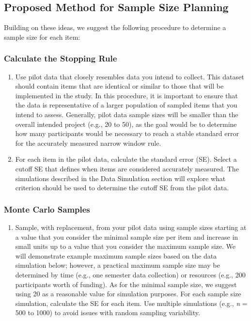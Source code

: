 \documentclass[
  man]{apa7}
\providecommand{\tightlist}{%
  \setlength{\itemsep}{0pt}\setlength{\parskip}{0pt}}
\begin{document}
\subsection{Proposed Method for Sample Size Planning}\label{proposed-method-for-sample-size-planning}

Building on these ideas, we suggest the following procedure to determine a sample size for each item:

\subsubsection{Calculate the Stopping Rule}\label{calculate-the-stopping-rule}

\begin{enumerate}
\def\labelenumi{\arabic{enumi})}
\item
  Use pilot data that closely resembles data you intend to collect. This dataset should contain items that are identical or similar to those that will be implemented in the study. In this procedure, it is important to ensure that the data is representative of a larger population of sampled items that you intend to assess. Generally, pilot data sample sizes will be smaller than the overall intended project (e.g., 20 to 50), as the goal would be to determine how many participants would be necessary to reach a stable standard error for the accurately measured narrow window rule.
\item
  For each item in the pilot data, calculate the standard error (SE). Select a cutoff SE that defines when items are considered accurately measured. The simulations described in the Data Simulation section will explore what criterion should be used to determine the cutoff SE from the pilot data.
\end{enumerate}

\subsubsection{Monte Carlo Samples}\label{monte-carlo-samples}

\begin{enumerate}
\def\labelenumi{\arabic{enumi})}
\setcounter{enumi}{2}
\tightlist
\item
  Sample, with replacement, from your pilot data using sample sizes starting at a value that you consider the minimal sample size per item and increase in small units up to a value that you consider the maximum sample size. We will demonstrate example maximum sample sizes based on the data simulation below; however, a practical maximum sample size may be determined by time (e.g., one semester data collection) or resources (e.g., 200 participants worth of funding). As for the minimal sample size, we suggest using 20 as a reasonable value for simulation purposes. For each sample size simulation, calculate the SE for each item. Use multiple simulations (e.g., \emph{n} = 500 to 1000) to avoid issues with random sampling variability.
\end{enumerate}
\end{document}
